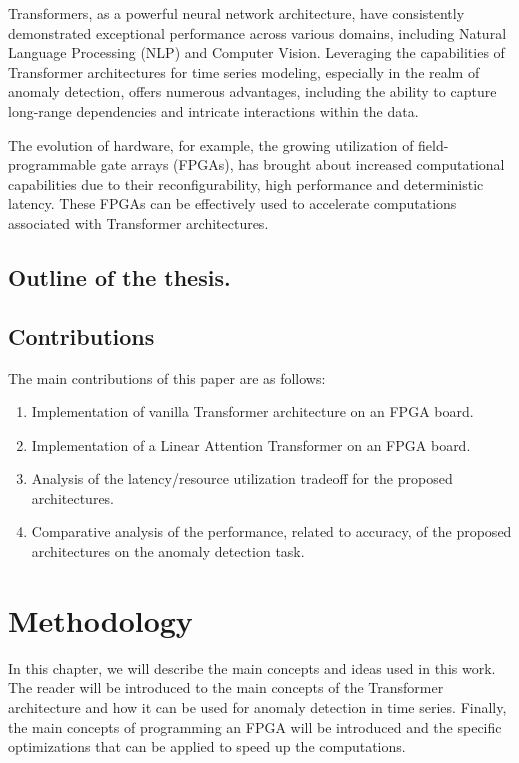 \documentclass[a4paper, twoside]{report}
\theoremstyle{definition}
\numberwithin{equation}{section}
\begin{document}
Transformers, as a powerful neural network architecture, have consistently
demonstrated exceptional performance across various domains, including Natural Language
Processing (NLP) and Computer Vision. Leveraging the capabilities of Transformer
architectures for time series modeling, especially in the realm of anomaly detection, offers
numerous advantages, including the ability to capture long-range dependencies and
intricate interactions within the data.


The evolution of hardware, for example, the growing utilization of
field-programmable gate arrays (FPGAs), has brought about increased computational capabilities
due to their reconfigurability, high performance and deterministic latency. These FPGAs can be
effectively used to accelerate computations associated with Transformer
architectures.


\section*{Outline of the thesis.}



\section*{Contributions}

The main contributions of this paper are as follows:
\begin{enumerate}
    \item Implementation of vanilla Transformer architecture on an FPGA board.
    \item Implementation of a Linear Attention Transformer on an FPGA board.
    \item Analysis of the latency/resource utilization tradeoff for the proposed architectures.
    \item Comparative analysis of the performance, related to accuracy, of the proposed architectures on the anomaly detection task.
\end{enumerate}


\chapter{Methodology}

In this chapter, we will describe the main concepts and ideas used in this work.
The reader will be introduced to the main concepts of the Transformer architecture and how it can be used for anomaly detection in time series.
Finally, the main concepts of programming an FPGA will be introduced and the specific optimizations that can be applied to speed up the computations.
\end{document}
